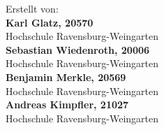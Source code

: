 \begin{titlepage}
\begin{center}
		\vspace{6.5cm}
		Erstellt von: \\ \vspace{0.5cm}
		\textbf{Karl Glatz, 20570} \\ {\small Hochschule Ravensburg-Weingarten} \\
		\vspace{0.3cm}
		\textbf{Sebastian Wiedenroth, 20006} \\ {\small Hochschule Ravensburg-Weingarten} \\
		\vspace{0.3cm}
		\textbf{Benjamin Merkle, 20569} \\ {\small Hochschule Ravensburg-Weingarten}\\
		\vspace{0.3cm}
		\textbf{Andreas Kimpfler, 21027} \\ {\small Hochschule Ravensburg-Weingarten}
	\end{center}
\end{titlepage}